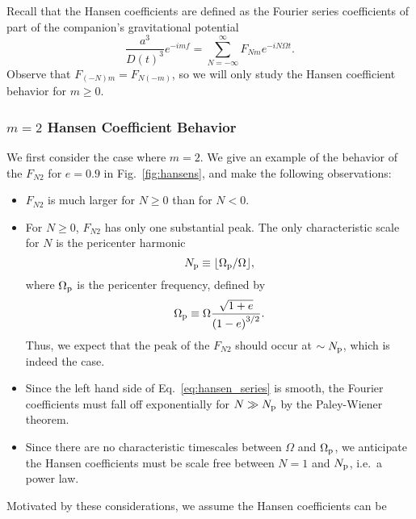 \documentclass[
        fleqn,
        usenatbib,
    ]{mnras}
\newcommand*{\p}[1]{\left(#1\right)}
\begin{document}
Recall that the Hansen coefficients are defined as the Fourier series
coefficients of part of the companion's gravitational potential
\begin{equation}
    \frac{a^3}{D(t)^3} e^{-imf} = \sum\limits_{N = -\infty}^\infty
        F_{Nm} e^{-iN\Omega t}.\label{eq:hansen_series}
\end{equation}
Observe that $F_{(-N)m} = F_{N(-m)}$, so we will only study the Hansen
coefficient behavior for $m \geq 0$.

\subsubsection{$m=2$ Hansen Coefficient Behavior}

We first consider the case where $m = 2$. We give an example of the behavior of
the $F_{N2}$ for $e = 0.9$ in Fig.~\ref{fig:hansens}, and make the following
observations:
\begin{itemize}
    \item $F_{N2}$ is much larger for $N \geq 0$ than for $N < 0$.

    \item For $N \geq 0$, $F_{N2}$ has only one substantial peak.
        The only characteristic scale for $N$ is the pericenter harmonic
        \begin{equation}
            N_{\rm p} \equiv \lfloor \Omega_{\rm p} / \Omega\rfloor,
        \end{equation}
        where $\Omega_{\rm p}$ is the pericenter frequency, defined by
        \begin{equation}
            \Omega_{\rm p} \equiv \Omega \frac{\sqrt{1 + e}}{\p{1 -
                e}^{3/2}}\label{eq:W_p}.
        \end{equation}
        Thus, we expect that the peak of the $F_{N2}$ should occur at $\sim
        N_{\rm p}$, which is indeed the case.

    \item Since the left hand side of Eq.~\eqref{eq:hansen_series} is smooth,
        the Fourier coefficients must fall off exponentially for $N \gg N_{\rm
        p}$ by the Paley-Wiener theorem.

    \item Since there are no characteristic timescales between $\Omega$ and
        $\Omega_{\rm p}$, we anticipate the Hansen coefficients must be scale
        free between $N = 1$ and $N_{\rm p}$, i.e.\ a power law.
\end{itemize}
Motivated by these considerations, we assume the Hansen coefficients can be
\end{document}
